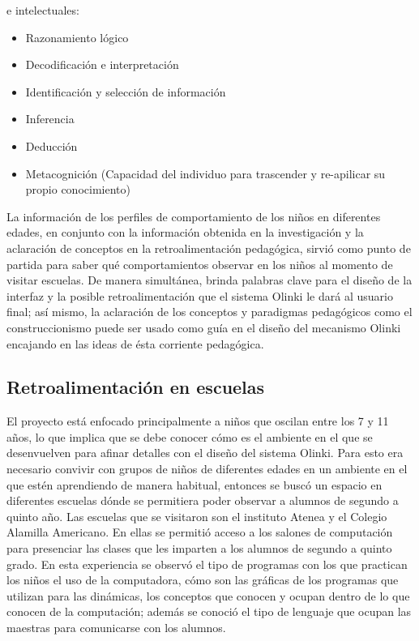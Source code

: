 \documentclass[letterpaper,10pt]{article}
\begin{document}
e intelectuales:
\begin{itemize}
	\item Razonamiento lógico
	\item Decodificación e interpretación
	\item Identificación y selección de información
	\item Inferencia
	\item Deducción
	\item Metacognición (Capacidad del individuo para trascender y re-apilicar su propio conocimiento)
\end{itemize}

La información de los perfiles de comportamiento de los niños en diferentes edades, 
en conjunto con la información obtenida en la investigación y la aclaración de 
conceptos en la retroalimentación pedagógica, sirvió como punto de partida para saber 
qué comportamientos observar en los niños al momento de visitar escuelas. 
De manera simultánea, brinda palabras clave para el diseño de la interfaz y la 
posible retroalimentación que el sistema Olinki le dará al usuario final; 
así mismo, la aclaración de los conceptos y paradigmas pedagógicos como el
construccionismo puede ser usado como guía en el diseño del mecanismo Olinki 
encajando en las ideas de ésta corriente pedagógica.

\subsection{Retroalimentación en escuelas}

El proyecto está enfocado principalmente a niños que oscilan entre los 7 y 11 años, 
lo que implica que se debe conocer cómo es el ambiente en el que se desenvuelven 
para afinar detalles con el diseño del sistema Olinki. 
Para esto era necesario convivir con grupos de niños de diferentes edades en un 
ambiente en el que estén aprendiendo de manera habitual, 
entonces se buscó un espacio en diferentes escuelas dónde se permitiera poder
observar a alumnos de segundo a quinto año.
\newline
Las escuelas que se visitaron son el instituto Atenea y el Colegio Alamilla Americano. 
En ellas se  permitió acceso a los salones de computación para presenciar las 
clases que les imparten a los alumnos de segundo a quinto grado. 
En esta experiencia se observó el tipo de programas con los que practican los niños 
el uso de la computadora, cómo son las gráficas de los programas que utilizan para 
las dinámicas, los conceptos que conocen y ocupan dentro de lo que conocen de la 
computación; además se conoció el tipo de lenguaje que ocupan las maestras para
comunicarse con los alumnos.
\end{document}
